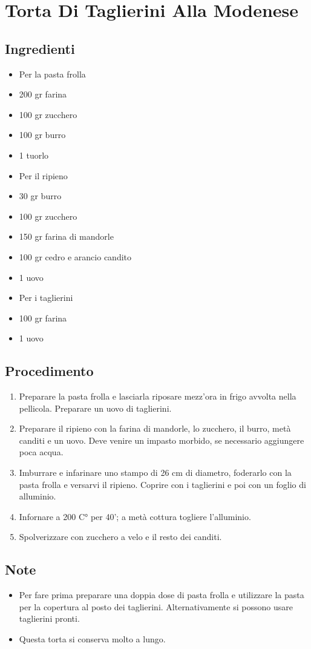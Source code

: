 \section{Torta Di Taglierini Alla Modenese}
\subsection{Ingredienti}
\begin{itemize}
\item Per la pasta frolla  
\item 200 gr farina  
\item 100 gr zucchero  
\item 100 gr burro   
\item 1 tuorlo  
\item Per il ripieno  
\item 30 gr burro  
\item 100 gr zucchero  
\item 150 gr farina di mandorle  
\item 100 gr cedro e arancio candito  
\item 1 uovo   
\item Per i taglierini  
\item 100 gr farina  
\item 1 uovo
\end{itemize}
\subsection{Procedimento}
\begin{enumerate}
\item  Preparare la pasta frolla e lasciarla riposare mezz'ora in frigo avvolta nella pellicola. Preparare un uovo di taglierini.  
\item  Preparare il ripieno con la farina di mandorle, lo zucchero, il burro, metà canditi e un uovo. Deve venire un impasto morbido, se necessario aggiungere poca acqua.  
\item  Imburrare e infarinare uno stampo di 26 cm di diametro, foderarlo con la pasta frolla e versarvi il ripieno. Coprire con i taglierini e poi con un foglio di alluminio.   
\item  Infornare a 200 C° per 40'; a metà cottura togliere l'alluminio.  
\item  Spolverizzare con zucchero a velo e il resto dei canditi.
\end{enumerate}
\subsection{Note}
\begin{itemize}
\item Per fare prima preparare una doppia dose di pasta frolla e utilizzare la pasta per la copertura al posto dei taglierini. Alternativamente si possono usare taglierini pronti.  
\item Questa torta si conserva molto a lungo.
\end{itemize}
